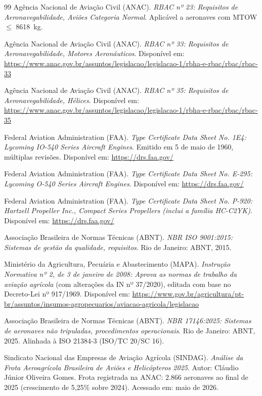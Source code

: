 \documentclass[a4paper,12pt]{article}
\begin{document}
\begin{thebibliography}{99}
    Agência Nacional de Aviação Civil (ANAC). \textit{RBAC nº 23: Requisitos de Aeronavegabilidade, Aviões Categoria Normal}. Aplicável a aeronaves com MTOW $\leq$ \SI{8618}{kg}.

    Agência Nacional de Aviação Civil (ANAC). \textit{RBAC nº 33: Requisitos de Aeronavegabilidade, Motores Aeronáuticos}. Disponível em: \url{https://www.anac.gov.br/assuntos/legislacao/legislacao-1/rbha-e-rbac/rbac/rbac-33}

    Agência Nacional de Aviação Civil (ANAC). \textit{RBAC nº 35: Requisitos de Aeronavegabilidade, Hélices}. Disponível em: \url{https://www.anac.gov.br/assuntos/legislacao/legislacao-1/rbha-e-rbac/rbac/rbac-35}

    Federal Aviation Administration (FAA). \textit{Type Certificate Data Sheet No. 1E4: Lycoming IO-540 Series Aircraft Engines}. Emitido em 5 de maio de 1960, múltiplas revisões. Disponível em: \url{https://drs.faa.gov/}

    Federal Aviation Administration (FAA). \textit{Type Certificate Data Sheet No. E-295: Lycoming O-540 Series Aircraft Engines}. Disponível em: \url{https://drs.faa.gov/}

    Federal Aviation Administration (FAA). \textit{Type Certificate Data Sheet No. P-920: Hartzell Propeller Inc., Compact Series Propellers (inclui a família HC-C2YK)}. Disponível em: \url{https://drs.faa.gov/}

    Associação Brasileira de Normas Técnicas (ABNT). \textit{NBR ISO 9001:2015: Sistemas de gestão da qualidade, requisitos}. Rio de Janeiro: ABNT, 2015.

    Ministério da Agricultura, Pecuária e Abastecimento (MAPA). \textit{Instrução Normativa nº 2, de 3 de janeiro de 2008: Aprova as normas de trabalho da aviação agrícola} (com alterações da IN nº 37/2020), editada com base no Decreto-Lei nº 917/1969. Disponível em: \url{https://www.gov.br/agricultura/pt-br/assuntos/insumos-agropecuarios/aviacao-agricola/legislacao}

    Associação Brasileira de Normas Técnicas (ABNT). \textit{NBR 17146:2025: Sistemas de aeronaves não tripuladas, procedimentos operacionais}. Rio de Janeiro: ABNT, 2025. Alinhada à ISO 21384-3 (ISO/TC 20/SC 16).

    Sindicato Nacional das Empresas de Aviação Agrícola (SINDAG). \textit{Análise da Frota Aeroagrícola Brasileira de Aviões e Helicópteros 2025}. Autor: Cláudio Júnior Oliveira Gomes. Frota registrada na ANAC: 2.866 aeronaves ao final de 2025 (crescimento de 5,25\% sobre 2024). Acessado em: maio de 2026.


\end{thebibliography}
\end{document}
